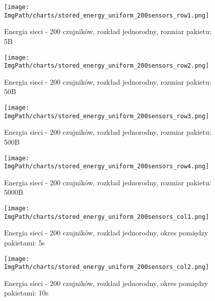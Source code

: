 \begin{figure}[!htbp]
	\begin{center}
		\texttt{[image: \\ImgPath/charts/stored\_energy\_uniform\_200sensors\_row1.png]}
	\end{center}
	\caption{Energia sieci - 200 czujników, rozkład jednorodny, rozmiar pakietu: 5B}
\end{figure}

\begin{figure}[!htbp]
	\begin{center}
		\texttt{[image: \\ImgPath/charts/stored\_energy\_uniform\_200sensors\_row2.png]}
	\end{center}
	\caption{Energia sieci - 200 czujników, rozkład jednorodny, rozmiar pakietu: 50B}
\end{figure}

\begin{figure}[!htbp]
	\begin{center}
		\texttt{[image: \\ImgPath/charts/stored\_energy\_uniform\_200sensors\_row3.png]}
	\end{center}
	\caption{Energia sieci - 200 czujników, rozkład jednorodny, rozmiar pakietu: 500B}
\end{figure}

\begin{figure}[!htbp]
	\begin{center}
		\texttt{[image: \\ImgPath/charts/stored\_energy\_uniform\_200sensors\_row4.png]}
	\end{center}
	\caption{Energia sieci - 200 czujników, rozkład jednorodny, rozmiar pakietu: 5000B}
\end{figure}

\begin{figure}[!htbp]
	\begin{center}
		\texttt{[image: \\ImgPath/charts/stored\_energy\_uniform\_200sensors\_col1.png]}
	\end{center}
	\caption{Energia sieci - 200 czujników, rozkład jednorodny, okres pomiędzy pakietami: 5s}
\end{figure}

\begin{figure}[!htbp]
	\begin{center}
		\texttt{[image: \\ImgPath/charts/stored\_energy\_uniform\_200sensors\_col2.png]}
	\end{center}
	\caption{Energia sieci - 200 czujników, rozkład jednorodny, okres pomiędzy pakietami: 10s}
\end{figure}

